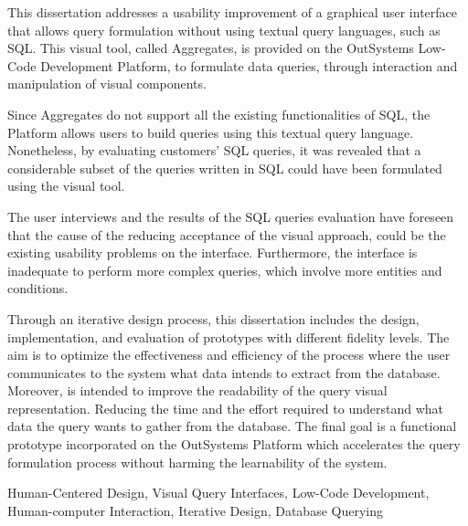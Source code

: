 
This dissertation addresses a usability improvement of a graphical user interface that allows query formulation without using textual query languages, such as SQL. This visual tool, called Aggregates, is provided on the OutSystems Low-Code Development Platform, to formulate data queries, through interaction and manipulation of visual components. 

Since Aggregates do not support all the existing functionalities of SQL, the Platform allows users to build queries using this textual query language. Nonetheless, by evaluating customers' SQL queries, it was revealed that a considerable subset of the queries written in SQL could have been formulated using the visual tool.

The user interviews and the results of the SQL queries evaluation have foreseen that the cause of the reducing acceptance of the visual approach, could be the existing usability problems on the interface. Furthermore, the interface is inadequate to perform more complex queries, which involve more entities and conditions.

Through an iterative design process, this dissertation includes the design, implementation, and evaluation of prototypes with different fidelity levels. The aim is to optimize the effectiveness and efficiency of the process where the user communicates to the system what data intends to extract from the database. Moreover, is intended to improve the readability of the query visual representation. Reducing the time and the effort required to understand what data the query wants to gather from the database. The final goal is a functional prototype incorporated on the OutSystems Platform which accelerates the query formulation process without harming the learnability of the system.


\begin{keywords}
Human-Centered Design, Visual Query Interfaces, Low-Code Development, Human-computer Interaction, Iterative Design, Database Querying
\end{keywords} 
